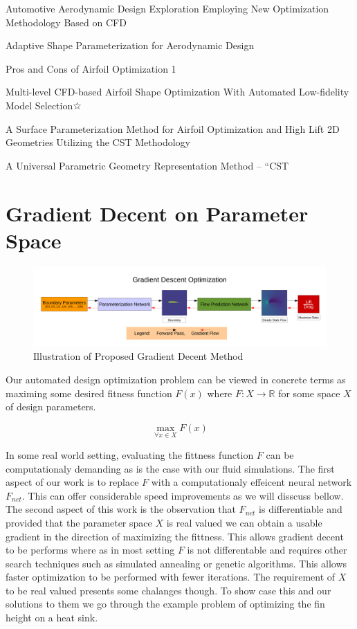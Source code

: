 \documentclass{article} %
\begin{document}
Automotive Aerodynamic Design Exploration
Employing New Optimization Methodology Based
on CFD

Adaptive Shape Parameterization for
Aerodynamic Design

Pros and Cons of Airfoil Optimization 1

Multi-level CFD-based Airfoil Shape Optimization With Automated Low-fidelity Model Selection☆

A Surface Parameterization Method for Airfoil Optimization
and High Lift 2D Geometries Utilizing the CST Methodology

A Universal Parametric Geometry Representation Method –
“CST


\section{Gradient Decent on Parameter Space}

\begin{figure}[h]
\begin{center}
\includegraphics[scale=0.34]{./gradient_descent_optimization.pdf}
\end{center}
\caption{Illustration of Proposed Gradient Decent Method}
\end{figure}


Our automated design optimization problem can be viewed in concrete terms as maximing some desired fitness function $F(x)$ where $F:X \rightarrow \mathbb{R}$ for some space $X$ of design parameters.

\begin{equation}
  \max_{\forall x \in X} F(x)
\end{equation}

In some real world setting, evaluating the fittness function $F$ can be computationaly demanding as is the case with our fluid simulations. The first aspect of our work is to replace $F$ with a computationaly effeicent neural network $F_{net}$. This can offer considerable speed improvements as we will disscuss bellow.  The second aspect of this work is the observation that $F_{net}$ is differentiable and provided that the parameter space $X$ is real valued we can obtain a usable gradient in the direction of maximizing the fittness. This allows gradient decent to be performs where as in most setting $F$ is not differentable and requires other search techniques such as simulated annealing or genetic algorithms. This allows faster optimization to be performed with fewer iterations. The requirement of $X$ to be real valued presents some chalanges though. To show case this and our solutions to them we go through the example problem of optimizing the fin height on a heat sink.
\end{document}
